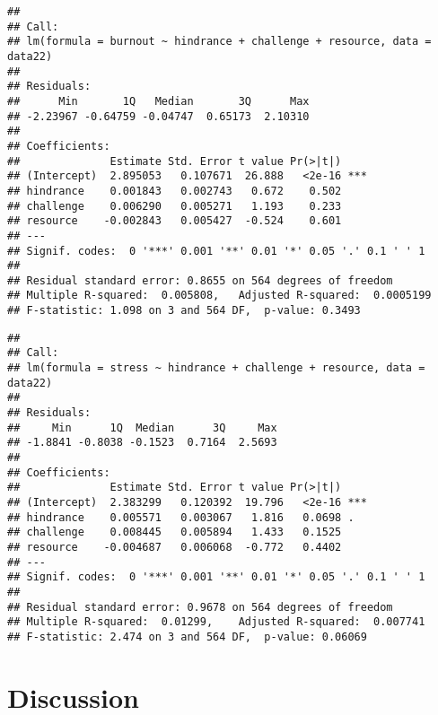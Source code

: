 \documentclass[
  man]{apa6}
\begin{document}
\begin{verbatim}
## 
## Call:
## lm(formula = burnout ~ hindrance + challenge + resource, data = data22)
## 
## Residuals:
##      Min       1Q   Median       3Q      Max 
## -2.23967 -0.64759 -0.04747  0.65173  2.10310 
## 
## Coefficients:
##              Estimate Std. Error t value Pr(>|t|)    
## (Intercept)  2.895053   0.107671  26.888   <2e-16 ***
## hindrance    0.001843   0.002743   0.672    0.502    
## challenge    0.006290   0.005271   1.193    0.233    
## resource    -0.002843   0.005427  -0.524    0.601    
## ---
## Signif. codes:  0 '***' 0.001 '**' 0.01 '*' 0.05 '.' 0.1 ' ' 1
## 
## Residual standard error: 0.8655 on 564 degrees of freedom
## Multiple R-squared:  0.005808,   Adjusted R-squared:  0.0005199 
## F-statistic: 1.098 on 3 and 564 DF,  p-value: 0.3493
\end{verbatim}

\begin{verbatim}
## 
## Call:
## lm(formula = stress ~ hindrance + challenge + resource, data = data22)
## 
## Residuals:
##     Min      1Q  Median      3Q     Max 
## -1.8841 -0.8038 -0.1523  0.7164  2.5693 
## 
## Coefficients:
##              Estimate Std. Error t value Pr(>|t|)    
## (Intercept)  2.383299   0.120392  19.796   <2e-16 ***
## hindrance    0.005571   0.003067   1.816   0.0698 .  
## challenge    0.008445   0.005894   1.433   0.1525    
## resource    -0.004687   0.006068  -0.772   0.4402    
## ---
## Signif. codes:  0 '***' 0.001 '**' 0.01 '*' 0.05 '.' 0.1 ' ' 1
## 
## Residual standard error: 0.9678 on 564 degrees of freedom
## Multiple R-squared:  0.01299,    Adjusted R-squared:  0.007741 
## F-statistic: 2.474 on 3 and 564 DF,  p-value: 0.06069
\end{verbatim}

\hypertarget{discussion}{%
\section{Discussion}\label{discussion}}
\end{document}
